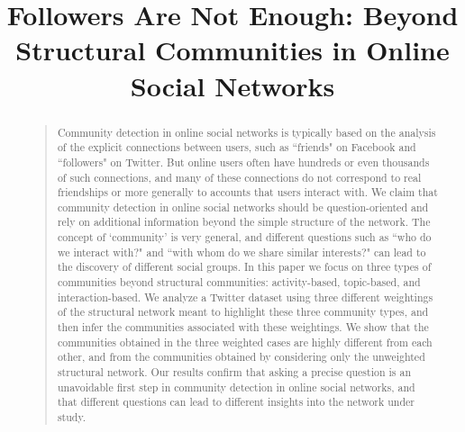 \documentclass[letterpaper]{article}
\begin{document}
\title{
Followers Are Not Enough: Beyond Structural Communities in Online Social Networks
 }
 

\maketitle

\begin{abstract}
\begin{quote}
Community detection in online social networks is typically based on the analysis of the explicit connections between users, such as ``friends" on Facebook and ``followers" on Twitter. But online users often have hundreds or even thousands of such connections, and many of these connections do not correspond to real friendships or more generally to accounts that users interact with. We claim that community detection in online social networks should be question-oriented and rely on additional information beyond the simple structure of the network. The concept of `community' is very general, and different questions such as ``who do we interact with?" and ``with whom do we share similar interests?" can lead to the discovery of different social groups. In this paper we focus on three types of communities beyond structural communities: activity-based, topic-based, and interaction-based. We analyze a Twitter dataset using three different weightings of the structural network meant to highlight these three community types, and then infer the communities associated with these weightings. We show that the communities obtained in the three weighted cases are highly different from each other, and from the communities obtained by considering only the unweighted structural network. Our results confirm that asking a precise question is an unavoidable first step in community detection in online social networks, and that different questions can lead to different insights into the network under study.
\end{quote}
\end{abstract}








\end{document}
